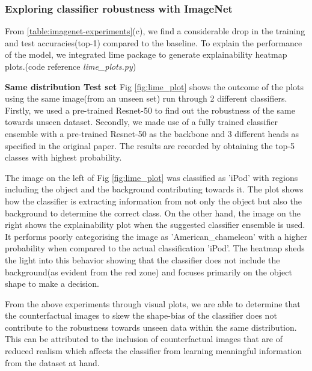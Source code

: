 \vspace{-}
\subsubsection{Exploring classifier robustness with ImageNet}

From \ref{table:imagenet-experiments}(c), we find a considerable drop in the training and test accuracies(top-1) compared to the baseline. To explain the performance of the model, we integrated lime\cite{lime} package to generate explainability heatmap plots.(code reference \textit{lime\_plots.py})

\textbf{Same distribution Test set}
Fig \ref{fig:lime_plot} shows the outcome of the plots using the same image(from an unseen set) run through 2 different classifiers. Firstly, we used a pre-trained Resnet-50 to find out the robustness of the same towards unseen dataset. Secondly, we made use of a fully trained classifier ensemble with a pre-trained Resnet-50 as the backbone and 3 different heads as specified in the original paper\cite{sauer2021counterfactual}. The results are recorded by obtaining the top-5 classes with highest probability. 

The image on the left of Fig \ref{fig:lime_plot} was classified as 'iPod' with regions including the object and the background contributing towards it. The plot shows how the classifier is extracting information from not only the object but also the background to determine the correct class. On the other hand, the image on the right shows the explainability plot when the suggested classifier ensemble is used. It performs poorly categorising the image as 'American\_chameleon' with a higher probability when compared to the actual classification 'iPod'. The heatmap sheds the light into this behavior showing that the classifier does not include the background(as evident from the red zone) and focuses primarily on the object shape to make a decision.

From the above experiments through visual plots, we are able to determine that the counterfactual images to skew the shape-bias of the classifier does not contribute to the robustness towards unseen data within the same distribution. This can be attributed to the inclusion of counterfactual images that are of reduced realism which affects the classifier from learning meaningful information from the dataset at hand.

% 


